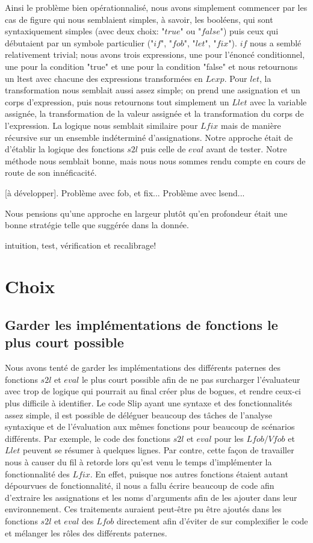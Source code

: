 \documentclass{article}
\begin{document}
	Ainsi le problème bien opérationnalisé, nous avons simplement commencer par
	les cas de figure qui nous semblaient simples, à savoir, les booléens, qui sont
	syntaxiquement simples (avec deux choix: "$true$" ou "$false$") puis ceux qui
	débutaient par un symbole particulier ("$if$", "$fob$", "$let$", "$fix$").
	$if$ nous a semblé relativement trivial; nous avons trois expressions, une
	pour l'énoncé conditionnel, une pour la condition "true" et une pour la condition
	"false" et nous retournons un ltest avec chacune des expressions transformées en
	$Lexp$. Pour $l et$, la transformation nous semblait aussi assez simple; on
	prend une assignation et un corps d'expression, puis nous retournons tout simplement
	un $Llet$ avec la variable assignée, la transformation de la valeur assignée
	et la transformation du corps de l'expression. La logique nous semblait similaire
	pour $Lfix$ mais de manière récursive sur un ensemble indéterminé d'assignations.
	Notre approche était de d'établir la logique des fonctions $s2l$ puis celle de
	$eval$ avant de tester. Notre méthode nous semblait bonne, mais nous nous
	sommes rendu compte en cours de route de son innéficacité.

	[à développer]. Problème avec fob, et fix... Problème avec lsend...

	Nous pensions qu'une approche en largeur plutôt qu'en profondeur était une bonne
	stratégie telle que suggérée dans la donnée.

	intuition, test, vérification et recalibrage!

	\section{Choix}

	\subsection{Garder les implémentations de fonctions le plus court possible}

	Nous avons tenté de garder les implémentations des différents paternes des fonctions
	$s2l$ et $eval$ le plus court possible afin de ne pas surcharger l'évaluateur avec
	trop de logique qui pourrait au final créer plus de bogues, et rendre ceux-ci
	plus difficile à identifier. Le code Slip ayant une syntaxe et des fonctionnalités
	assez simple, il est possible de déléguer beaucoup des tâches de l'analyse
	syntaxique et de l'évaluation aux mêmes fonctions pour beaucoup de scénarios
	différents. Par exemple, le code des fonctions $s2l$ et $eval$ pour les
	$Lfob/Vfob$ et $Llet$ peuvent se résumer à quelques lignes. Par contre, cette
	façon de travailler nous à causer du fil à retorde lors qu’est venu le temps d'implémenter
	la fonctionnalité des $Lfix$. En effet, puisque nos autres fonctions étaient
	autant dépourvues de fonctionnalité, il nous a fallu écrire beaucoup de code afin
	d'extraire les assignations et les noms d'arguments afin de les ajouter dans leur
	environnement. Ces traitements auraient peut-être pu être ajoutés dans les
	fonctions $s2l$ et $eval$ des $Lfob$ directement afin d'éviter de sur
	complexifier le code et mélanger les rôles des différents paternes.
\end{document}
